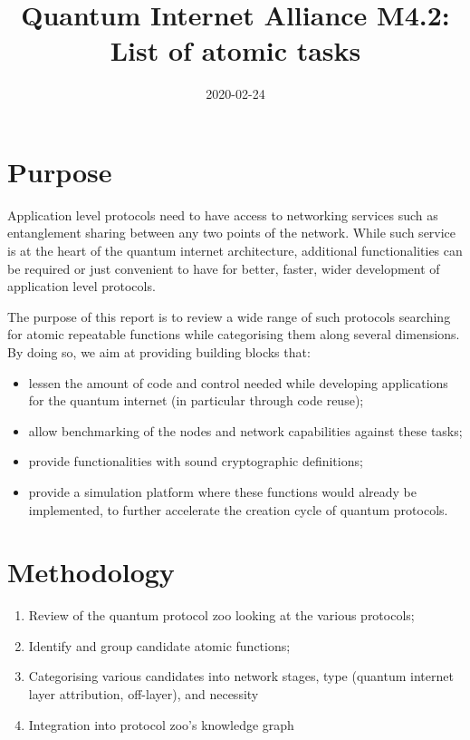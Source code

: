 \documentclass[11pt]{article}
\date{2020-02-24}
\title{Quantum Internet Alliance M4.2: List of atomic tasks}
\begin{document}
\maketitle


\section{Purpose}
\label{sec:orgdb88929}
Application level protocols need to have access to networking services such as entanglement sharing between any two points of the network. While such service is at the heart of the quantum internet architecture, additional functionalities can be required or just convenient to have for better, faster, wider development of application level protocols. 

The purpose of this report is to review a wide range of such protocols searching for atomic repeatable functions while categorising them along several dimensions. By doing so, we aim at providing building blocks that:
\begin{itemize}
\item lessen the amount of code and control needed while developing applications for the quantum internet (in particular through code reuse);
\item allow benchmarking of the nodes and network capabilities against these tasks;
\item provide functionalities with sound cryptographic definitions;
\item provide a simulation platform where these functions would already be implemented, to further accelerate the creation cycle of quantum protocols.
\end{itemize}

\section{Methodology}
\label{sec:orgd48be91}
\begin{enumerate}
\item Review of the quantum protocol zoo looking at the various protocols;
\item Identify and group candidate atomic functions;
\item Categorising various candidates into network stages, type (quantum internet layer attribution, off-layer), and necessity
\item Integration into protocol zoo's knowledge graph
\end{enumerate}
\end{document}
